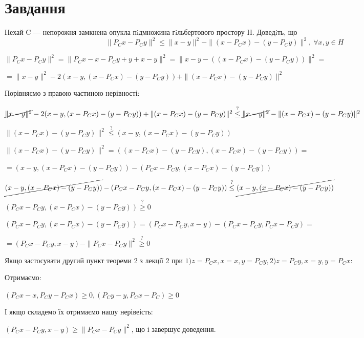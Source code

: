 
\chapter{Завдання \theHchapter}

\begin{tcolorbox}[title=Завдання]
    Нехай C — непорожня замкнена опукла пiдмножина гiльбертового простору H. Доведiть, що
    $$ \| P_Cx - P_Cy  \|^ 2 \le
    \| x - y \| ^ 2 - 
    \| (x - P_Cx) - (y - P_Cy) \| ^ 2, \ \forall x, y \in H $$
\end{tcolorbox}



$ \| P_Cx - P_Cy  \|^ 2 = \| P_Cx - x - P_Cy + y + x - y  \|^ 2 = 
\| x - y - ((x - P_Cx) - (y - P_Cy))  \|^ 2 = $


$= \| x - y \| ^ 2 - 2 ( x - y,(x - P_Cx) - (y - P_Cy) ) + 
\| (x - P_Cx) - (y - P_Cy) \| ^ 2 $


Порівняємо з правою частиною нерівності:


$ \cancel{\| x - y \| ^ 2} - 2 ( x - y,(x - P_Cx) - (y - P_Cy) ) + 
\| (x - P_Cx) - (y - P_Cy) \| ^ 2 \stackrel{?}{\le} 
\cancel{\|x - y\|^2} - \| (x - P_Cx) - (y - P_Cy) \| ^ 2 $



$\|(x - P_Cx) - (y - P_Cy) \| ^ 2 \stackrel{?}{\le} 
(x - y,(x - P_Cx) - (y - P_Cy))$


$ \|(x - P_Cx) - (y - P_Cy) \| ^ 2 = 
((x - P_Cx) - (y - P_Cy), (x - P_Cx) - (y - P_Cy)) =$


$= (x - y, (x - P_Cx) - (y - P_Cy)) - (P_Cx - P_Cy, (x - P_Cx) - (y - P_Cy)) $


$ \cancel{(x - y, (x - P_Cx) - (y - P_Cy))} - (P_Cx - P_Cy, (x - P_Cx) - (y - P_Cy)) 
\stackrel{?}{\le} \cancel{(x - y,(x - P_Cx) - (y - P_Cy))} $


$(P_Cx - P_Cy, (x - P_Cx) - (y - P_Cy)) \stackrel{?}{\geq} 0 $


$(P_Cx - P_Cy, (x - P_Cx) - (y - P_Cy)) = 
(P_Cx - P_Cy, x - y) - (P_Cx - P_Cy,  P_Cx - P_Cy) = $


$=(P_Cx - P_Cy, x - y) - \|P_Cx - P_Cy \|^2 \stackrel{?}{\geq} 0 $


Якщо застосувати другий пункт теореми 2 з лекції 2 
при $1)z = P_Cx, x = x, y = P_Cy, 2)z = P_Cy, x = y, y = P_Cx $:


Отримаємо:


$ (P_Cx - x, P_Cy - P_Cx) \geq 0 , (P_Cy - y, P_Cx - P_C) \geq 0$


І якщо складемо їх отримаємо нашу нерівеість:


$(P_Cx - P_Cy, x - y) \geq \|P_Cx - P_Cy \|^2  $, що і завершує доведення.


